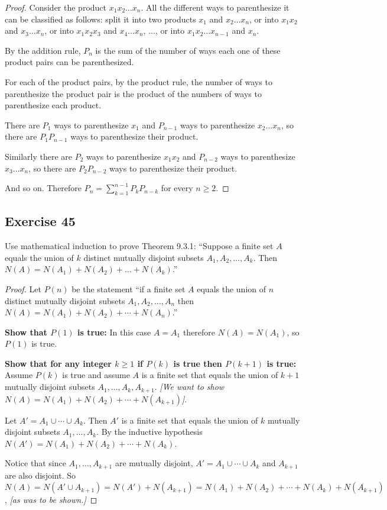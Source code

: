 \documentclass[14pt]{extarticle}
\begin{document}
\begin{proof}
Consider the product \(x_1x_2 \ldots x_n\). All the different ways to parenthesize it can be classified as 
follows: split it into two products \(x_1\) and \(x_2 \ldots x_n\), or into \(x_1x_2\) and \(x_3 \ldots x_n\),
or into \(x_1x_2x_3\) and \(x_4 \ldots x_n\), \(\ldots\), or into \(x_1x_2 \ldots x_{n-1}\) and \(x_n\).

By the addition rule, $P_n$ is the sum of the number of ways each one of these product pairs can be parenthesized.

For each of the product pairs, by the product rule, the number of ways to parenthesize the product pair is the 
product of the numbers of ways to parenthesize each product.

There are \(P_1\) ways to parenthesize \(x_1\) and \(P_{n-1}\) ways to parenthesize \(x_2 \ldots x_n\), so 
there are \(P_1P_{n-1}\) ways to parenthesize their product.

Similarly there are \(P_2\) ways to parenthesize \(x_1x_2\) and \(P_{n-2}\) ways to parenthesize \(x_3 \ldots x_n\), so 
there are \(P_2P_{n-2}\) ways to parenthesize their product.

And so on. Therefore \(P_n = \sum_{k=1}^{n-1} P_k P_{n-k}\) for every \(n \geq 2\).
\end{proof}

\subsection{Exercise 45}
Use mathematical induction to prove Theorem 9.3.1: ``Suppose a finite set $A$ equals the union of $k$ distinct 
mutually disjoint subsets \(A_1, A_2, \ldots, A_k\). Then \(N(A) = N(A_1) + N(A_2) + \ldots + N(A_k)\).''

\begin{proof}
Let \(P(n)\) be the statement ``if a finite set $A$ equals the union of $n$ distinct mutually disjoint subsets 
\(A_1, A_2, \ldots, A_n\) then \(N(A) = N(A_1) + N(A_2) + \cdots + N(A_n)\).''

{\bf Show that \(P(1)\) is true:} In this case \(A = A_1\) therefore \(N(A) = N(A_1)\), so \(P(1)\) is true.

{\bf Show that for any integer \(k \geq 1\) if \(P(k)\) is true then \(P(k+1)\) is true:} Assume \(P(k)\) is true and 
assume \(A\) is a finite set that equals the union of $k+1$ mutually disjoint subsets \(A_1, \ldots, A_k, A_{k+1}\).
{\it [We want to show \(N(A) = N(A_1) + N(A_2) + \cdots + N(A_{k+1})\)]}.

Let \(A' = A_1 \cup \cdots \cup A_k\). Then \(A'\) is a finite set that equals the union of $k$ mutually disjoint 
subsets \(A_1, \ldots, A_k\). By the inductive hypothesis \(N(A') = N(A_1) + N(A_2) + \cdots + N(A_k)\).

Notice that since \(A_1, \ldots, A_{k+1}\) are mutually disjoint, \(A' = A_1 \cup \cdots \cup A_k\) and \(A_{k+1}\) 
are also disjoint. So \(N(A) = N(A' \cup A_{k+1}) = N(A') + N(A_{k+1})=N(A_1) +N(A_2) + \cdots + N(A_k) + N(A_{k+1})\), 
{\it [as was to be shown.]}
\end{proof}
\end{document}
